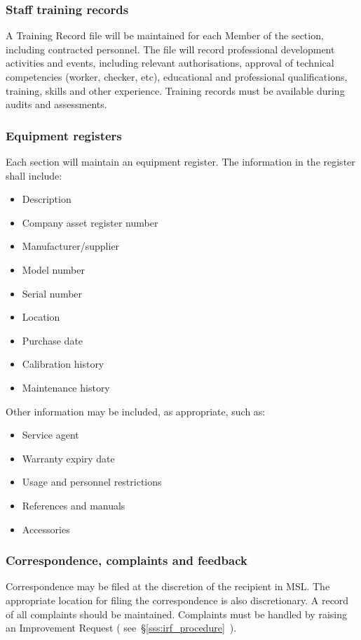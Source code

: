 \subsubsection{Staff training records}
\label{sss:training_records}
A Training Record file will be maintained for each Member of the section, including contracted personnel. The file will record professional development activities and events, including relevant authorisations, approval of technical competencies (worker, checker, etc), educational and professional qualifications, training, skills and other experience. 
Training records must be available during audits and assessments. 

\subsubsection{Equipment registers}
\label{sss:equipment_register}
Each section will maintain an equipment register. The information in the register shall include: 
\begin{itemize}
\item Description 
\item Company asset register number 
\item Manufacturer/supplier 
\item Model number 
\item Serial number 
\item Location
\item Purchase date 
\item Calibration history 
\item Maintenance history
\end{itemize}
Other information may be included, as appropriate, such as:
\begin{itemize}\item Service agent 
\item Warranty expiry date 
\item Usage and personnel restrictions
\item References and manuals
\item Accessories
\end{itemize}

\subsubsection{Correspondence, complaints and feedback}
Correspondence may be filed at the discretion of the recipient in MSL. The appropriate location for filing the correspondence is also discretionary. 
A record of all complaints should be maintained. Complaints must be handled by raising an Improvement Request ( see~\S\ref{sss:irf_procedure}~).

